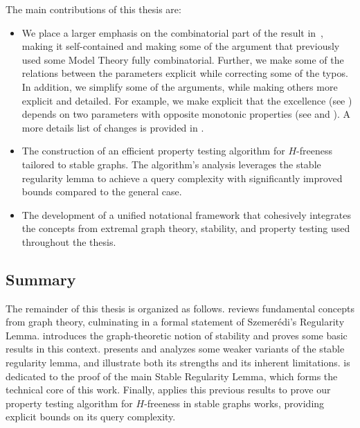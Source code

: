         The main contributions of this thesis are:
        \begin{itemize}
            \item We place a larger emphasis on the combinatorial part of the result
                in~\cite{regularity_lemmas_for_stable_graphs}, making it self-contained and making some of the argument that
                previously used some Model Theory fully combinatorial.
                Further, we make some of the relations between the parameters explicit while correcting some of the typos.
                In addition, we simplify some of the arguments, while making others more explicit and detailed.
                For example, we make explicit that the excellence (see ) depends on two parameters
                with opposite monotonic properties (see  and ).
                A more details list of changes is provided in .
            \item The construction of an efficient property testing algorithm for $H$-freeness tailored to stable graphs.
                The algorithm's analysis leverages the stable regularity lemma to achieve a query complexity with significantly
                improved bounds compared to the general case.
            \item The development of a unified notational framework that cohesively integrates the concepts from
                extremal graph theory, stability, and property testing used throughout the thesis.
        \end{itemize}

    \subsection{Summary} \label{subsec:summary}

        The remainder of this thesis is organized as follows.
         reviews fundamental concepts from graph theory, culminating in a formal statement of Szemer\'edi's
        Regularity Lemma.
         introduces the graph-theoretic notion of stability and proves some basic results in this context.
         presents and analyzes some weaker variants of the stable regularity lemma, and illustrate both its
        strengths and its inherent limitations.
         is dedicated to the proof of the main Stable Regularity Lemma, which forms the technical core of this
        work.
        Finally,  applies this previous results to prove our property testing algorithm for
        $H$-freeness in stable graphs works, providing explicit bounds on its query complexity.
